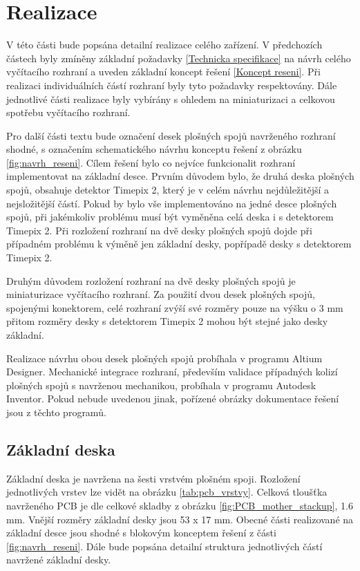 \chapter{Realizace}
\label{realizace}
V této části bude popsána detailní realizace celého zařízení. V předchozích částech byly zmíněny základní požadavky \ref{Technicka specifikace} na návrh celého vyčítacího rozhraní a uveden základní koncept řešení \ref{Koncept reseni}. Při realizaci individuálních částí rozhraní byly tyto požadavky respektovány. Dále jednotlivé části realizace byly vybírány s ohledem na miniaturizaci a celkovou spotřebu vyčítacího rozhraní. 

\par Pro další části textu bude označení desek plošných spojů navrženého rozhraní shodné, s označením schematického návrhu konceptu řešení z obrázku \ref{fig:navrh_reseni}. Cílem řešení bylo co nejvíce funkcionalit rozhraní implementovat na základní desce. Prvním důvodem bylo, že druhá deska plošných spojů, obsahuje detektor Timepix 2, který je v celém návrhu nejdůležitější a nejsložitější částí. Pokud by bylo vše implementováno na jedné desce plošných spojů, při jakémkoliv problému musí být vyměněna celá deska i s detektorem Timepix 2. Při rozložení rozhraní na dvě desky plošných spojů dojde při případném problému k výměně jen základní desky, popřípadě desky s detektorem Timepix 2. 
\par Druhým důvodem rozložení rozhraní na dvě desky plošných spojů je miniaturizace vyčítacího rozhraní. Za použití dvou desek plošných spojů, spojenými konektorem, celé rozhraní zvýší své rozměry pouze na výšku o 3 mm přitom rozměry desky s detektorem Timepix 2 mohou být stejné jako desky základní.

\par Realizace návrhu obou desek plošných spojů probíhala v programu Altium Designer. Mechanické integrace rozhraní, především validace případných kolizí plošných spojů s navrženou mechanikou, probíhala v programu Autodesk Inventor. Pokud nebude uvedenou jinak, pořízené obrázky dokumentace řešení jsou z těchto programů.

\section{Základní deska}	
	\label{zakladni deska}
	Základní deska je navržena na šesti vrstvém plošném spoji. Rozložení jednotlivých vrstev lze vidět na obrázku \ref{tab:pcb_vrstvy}. Celková tloušťka navrženého PCB je dle celkové skladby z obrázku \ref{fig:PCB_mother_stackup}, 1.6 mm. Vnější rozměry základní desky jsou 53 x 17 mm. Obecné části realizované na základní desce jsou shodné s blokovým konceptem řešení z části \ref{fig:navrh_reseni}. Dále bude popsána detailní struktura jednotlivých částí navržené základní desky.

